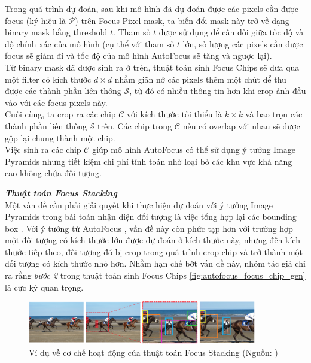 {    \noindent
    Trong quá trình dự đoán, sau khi mô hình đã dự đoán được các pixels  cần được focus (ký hiệu là $\mathcal{P}$) trên Focus Pixel  mask, ta biến đổi mask này trở về dạng binary mask bằng threshold $t$.
    Tham số $t$ được sử dụng để cân đối giữa tốc độ và độ chính xác của mô hình (cụ thể với tham số $t$ lớn, số lượng các pixels  cần được focus sẽ giảm đi và tốc độ của mô hình AutoFocus sẽ tăng và ngược lại). \\
    Từ binary mask đã được sinh ra ở trên, thuật toán sinh Focus Chips sẽ đưa qua một filter có kích thước $d \times d$ nhằm giãn nở các pixels  thêm một chút để thu được các thành phần liên thông $\mathcal{S}$, từ đó có nhiều thông tin hơn khi crop ảnh đầu vào với các focus pixels  này. \\
    Cuối cùng, ta crop ra các chip $\mathcal{C}$ với kích thước tối thiểu là $k \times k$ và bao trọn các thành phần liên thông $\mathcal{S}$ trên.
    Các chip trong $\mathcal{C}$ nếu có overlap với nhau sẽ được gộp lại chung thành một chip. \\
    Việc sinh ra các chip $\mathcal{C}$ giúp mô hình AutoFocus có thể sử dụng ý tưởng Image Pyramids nhưng tiết kiệm chi phí tính toán nhờ loại bỏ các khu vực khả năng cao không chứa đối tượng.

    \noindent
    \textbf{\textit{Thuật toán Focus Stacking}} \\
    Một vấn đề cần phải giải quyết khi thực hiện dự đoán với ý tưởng Image Pyramids trong bài toán nhận diện đối tượng  là việc tổng hợp lại các bounding box .
    Với ý tưởng từ AutoFocus \cite{najibi2019autofocus}, vấn đề này còn phức tạp hơn với trường hợp một đối tượng có kích thước lớn được dự đoán ở kích thước này, nhưng đến kích thước tiếp theo, đối tượng đó bị crop trong quá trình crop chip và trở thành một đối tượng có kích thước nhỏ hơn.
    Nhằm hạn chế bớt vấn đề này, nhóm tác giả chỉ ra rằng \textit{bước 2} trong thuật toán sinh Focus Chips \ref{fig:autofocus_focus_chip_gen} là cực kỳ quan trọng.

    \begin{figure}[H]
        \centering
        \includegraphics[width=10cm] {images/autofocus_focus_stack}
        \caption{Ví dụ về cơ chế hoạt động của thuật toán Focus Stacking (Nguồn: \cite{najibi2019autofocus})}
        \label{fig:autofocus_focus_stack}
    \end{figure}

}
